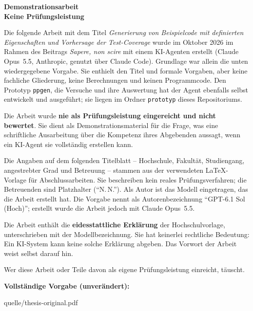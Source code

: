 \documentclass[11pt,a4paper]{article}
\newcommand{\vermerk}{%
  \begin{tikzpicture}[remember picture,overlay]
    \node[anchor=north,yshift=-5mm,fill=white,fill opacity=0.85,
          text opacity=1,inner sep=3pt,font=\sffamily\footnotesize,
          text=red!60!black]
      at (current page.north)
      {Demonstrationsarbeit -- mit KI erstellt -- keine Prüfungsleistung};
  \end{tikzpicture}}
\begin{document}
\begin{center}
  {\sffamily\bfseries\Large Demonstrationsarbeit\\[0.3em]
  Keine Prüfungsleistung\par}
\end{center}

\vspace{1em}
Die folgende Arbeit mit dem Titel \emph{Generierung von Beispielcode
mit definierten Eigenschaften und Vorhersage der Test-Coverage}
wurde im Oktober 2026 im Rahmen des Beitrags \emph{Sapere, non
scire} mit einem KI-Agenten erstellt (Claude Opus~5.5, Anthropic,
genutzt über Claude Code). Grundlage war allein die unten
wiedergegebene Vorgabe. Sie enthielt den Titel und formale Vorgaben,
aber keine fachliche Gliederung, keine Berechnungen und keinen
Programmcode. Den Prototyp \texttt{ppgen}, die Versuche und ihre
Auswertung hat der Agent ebenfalls selbst entwickelt und ausgeführt;
sie liegen im Ordner \texttt{prototyp} dieses Repositoriums.

Die Arbeit wurde \textbf{nie als Prüfungsleistung eingereicht und
nicht bewertet}. Sie dient als Demonstrationsmaterial für die Frage,
was eine schriftliche Ausarbeitung über die Kompetenz ihres
Abgebenden aussagt, wenn ein KI-Agent sie vollständig erstellen kann.

Die Angaben auf dem folgenden Titelblatt -- Hochschule, Fakultät,
Studiengang, angestrebter Grad und Betreuung -- stammen aus der
verwendeten LaTeX-Vorlage für Abschlussarbeiten. Sie beschreiben
kein reales Prüfungsverfahren; die Betreuenden sind Platzhalter
(\enquote{N.\,N.}). Als Autor ist das Modell eingetragen,
das die Arbeit erstellt hat. Die Vorgabe nennt als
Autorenbezeichnung \enquote{GPT-6.1 Sol (Hoch)}; erstellt wurde die
Arbeit jedoch mit Claude Opus~5.5.

Die Arbeit enthält die \textbf{eidesstattliche Erklärung} der
Hochschulvorlage, unterschrieben mit der Modellbezeichnung. Sie hat
keinerlei rechtliche Bedeutung: Ein KI-System kann keine solche
Erklärung abgeben. Das Vorwort der Arbeit weist selbst darauf hin.

Wer diese Arbeit oder Teile davon als eigene Prüfungsleistung
einreicht, täuscht.

\medskip
\textbf{Vollständige Vorgabe (unverändert):}
\begin{center}
\begin{minipage}{0.9\linewidth}

\end{minipage}
\end{center}

\clearpage
%
  {quelle/thesis-original.pdf}
\end{document}
